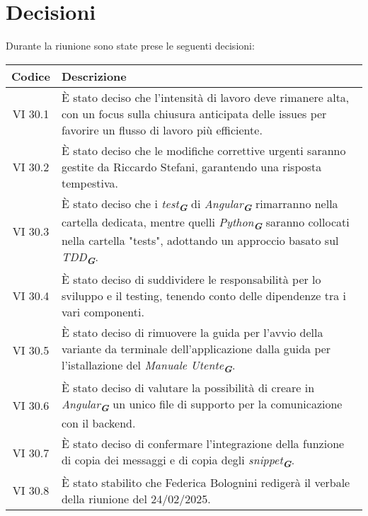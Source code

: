 
\section{Decisioni}

Durante la riunione sono state prese le seguenti decisioni:

\vspace{0.5cm}

\begin{table}[htbp]
    \centering
    \begin{tabular}{|c|p{}|}
        \hline
        \rowcolor[gray]{0.75}
        \textbf{Codice} & \textbf{Descrizione}\\
        \hline
        VI 30.1 & È stato deciso che l’intensità di lavoro deve rimanere alta, con un focus sulla chiusura anticipata delle issues per favorire un flusso di lavoro più efficiente.\\
        \hline
        VI 30.2 & È stato deciso che le modifiche correttive urgenti saranno gestite da Riccardo Stefani, garantendo una risposta tempestiva. \\
        \hline
        VI 30.3 & È stato deciso che i \emph{test}\textsubscript{\textit{\textbf{G}}} di \emph{Angular}\textsubscript{\textit{\textbf{G}}} rimarranno nella cartella dedicata, mentre quelli \emph{Python}\textsubscript{\textit{\textbf{G}}} saranno collocati nella cartella "tests", adottando un approccio basato sul \emph{TDD}\textsubscript{\textit{\textbf{G}}}. \\ 
        \hline
        VI 30.4 & È stato deciso di suddividere le responsabilità per lo sviluppo e il testing, tenendo conto delle dipendenze tra i vari componenti. \\ 
        \hline
        VI 30.5 & È stato deciso di rimuovere la guida per l'avvio della variante da terminale dell'applicazione dalla guida per l'istallazione del \emph{Manuale Utente}\textsubscript{\textit{\textbf{G}}}. \\ 
        \hline
        VI 30.6 & È stato deciso di valutare la possibilità di creare in \emph{Angular}\textsubscript{\textit{\textbf{G}}} un unico file di supporto per la comunicazione con il backend. \\ 
        \hline
        VI 30.7 & È stato deciso di confermare l’integrazione della funzione di copia dei messaggi e di copia degli \emph{snippet}\textsubscript{\textit{\textbf{G}}}. \\        
        \hline
        VI 30.8 & È stato stabilito che Federica Bolognini redigerà il verbale della riunione del 24/02/2025. \\        
        \hline
    \end{tabular}
\end{table}